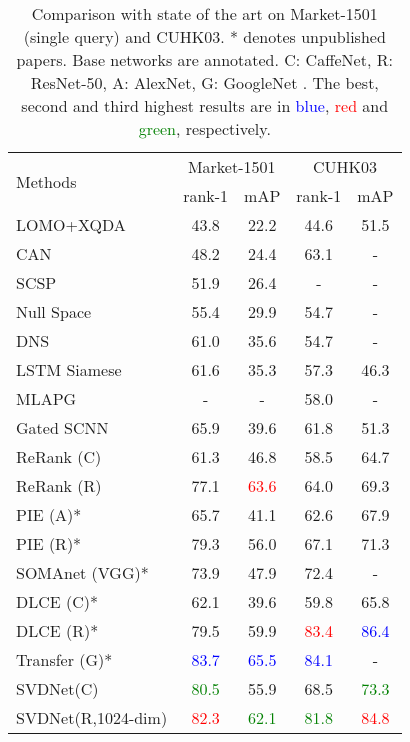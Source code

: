 \documentclass[10pt,twocolumn,letterpaper]{article}
\begin{document}
\setlength{\tabcolsep}{5pt}
\begin{table}[t]
\begin{center}
\begin{tabular}{l|cc|cc}
\hline
\multicolumn{1}{l|}{\multirow{2}{*}{Methods}}&\multicolumn{2}{c|}{Market-1501}&\multicolumn{2}{c}{CUHK03}\\
\cline{2-5}
\multicolumn{1}{c|}{}&rank-1&mAP&rank-1&mAP\\
\hline
\hline
LOMO+XQDA\cite{DBLP:conf/cvpr/LiaoHZL15}     &43.8&22.2      &44.6&51.5\\
CAN\cite{DBLP:journals/corr/LiuFQJY16}           &48.2&24.4      &63.1&-   \\
SCSP\cite{DBLP:conf/cvpr/ChenYCZ16}          &51.9&26.4      &-   &-   \\
Null Space\cite{DBLP:conf/cvpr/ZhangXG16}    &55.4&29.9      &54.7&-   \\
DNS\cite{DBLP:conf/cvpr/ZhangXG16}           &61.0&35.6      &54.7&-   \\
LSTM Siamese\cite{DBLP:conf/eccv/VariorSLXW16}  &61.6&35.3      &57.3&46.3\\
MLAPG\cite{DBLP:conf/iccv/LiaoL15}         &-   &-         &58.0&-   \\
Gated SCNN\cite{DBLP:conf/eccv/VariorHW16}    &65.9&39.6      &61.8&51.3\\
ReRank (C) \cite{DBLP:conf/cvpr/ZhongZCL17}     &61.3&46.8      &58.5&64.7\\
ReRank (R) \cite{DBLP:conf/cvpr/ZhongZCL17}     &77.1&\textcolor{red}{63.6}      &64.0&69.3\\
\hline
PIE (A)* \cite{DBLP:journals/corr/ZhengHLY17}        &65.7&41.1      &62.6&67.9\\
PIE (R)* \cite{DBLP:journals/corr/ZhengHLY17}        &79.3&56.0      &67.1&71.3\\
SOMAnet (VGG)* \cite{barbosa2017looking} &73.9&47.9&72.4&-\\
DLCE (C)* \cite{DBLP:journals/corr/ZhengZY16}       &62.1&39.6      &59.8&65.8\\
DLCE (R)* \cite{DBLP:journals/corr/ZhengZY16}       &79.5&59.9      &\textcolor{red}{83.4}&\textcolor{blue}{86.4}\\
Transfer (G)* \cite{geng2016deep}  &\textcolor{blue}{83.7}&\textcolor{blue}{65.5}      &\textcolor{blue}{84.1}&-\\
\hline
SVDNet(C)     &\textcolor{green}{80.5}&55.9      &68.5&\textcolor{green}{73.3}\\
SVDNet(R,1024-dim)&\textcolor{red}{82.3}&\textcolor{green}{62.1}     &\textcolor{green}{81.8}&\textcolor{red}{84.8}\\
\hline
\end{tabular}
\end{center}
\setlength{\abovecaptionskip}{-0cm} 
\caption{Comparison with state of the art on Market-1501 (single query) and CUHK03. * denotes unpublished papers. Base networks are annotated. C: CaffeNet, R: ResNet-50, A: AlexNet, G: GoogleNet \cite{szegedy2015going}. The best, second and third highest results are in \textcolor{blue}{blue}, \textcolor{red}{red} and \textcolor{green}{green}, respectively.}
\label{table:sota-market}
\end{table}
\end{document}
